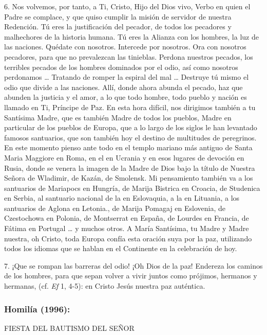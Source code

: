 \begin{body}
	6. Nos volvemos, por tanto, a Ti, Cristo, Hijo del Dios vivo, Verbo en quien el Padre se complace, y que quiso cumplir la misión de servidor de nuestra Redención. Tú eres la justificación del pecador, de todos los pecadores y malhechores de la historia humana. Tú eres la Alianza con los hombres, la luz de las naciones. Quédate con nosotros. Intercede por nosotros. Ora con nosotros pecadores, para que no prevalezcan las tinieblas. Perdona nuestros pecados, los terribles pecados de los hombres dominados por el odio, así como nosotros perdonamos \ldots{} Tratando de romper la espiral del mal \ldots{} Destruye tú mismo el odio que divide a las naciones. Allí, donde ahora abunda el pecado, haz que abunden la justicia y el amor, a lo que todo hombre, todo pueblo y nación es llamado en Ti, Príncipe de Paz. En esta hora difícil, nos dirigimos también a tu Santísima Madre, que es también Madre de todos los pueblos, Madre en particular de los pueblos de Europa, que a lo largo de los siglos le han levantado famosos santuarios, que son también hoy el destino de multitudes de peregrinos. En este momento pienso ante todo en el templo mariano más antiguo de Santa Maria Maggiore en Roma, en el  en Ucrania y en esos lugares de devoción en Rusia, donde se venera la imagen de la Madre de Dios bajo la título de Nuestra Señora de Wladimir, de Kazán, de Smolensk. Mi pensamiento también va a los santuarios de Mariapocs en Hungría, de Marija Bistrica en Croacia, de Studenica en Serbia, al santuario nacional de la  en Eslovaquia, a la  en Lituania, a los santuarios de Aglona en Letonia., de Marija Pomagaj en Eslovenia, de Czestochowa en Polonia, de Montserrat en España, de Lourdes en Francia, de Fátima en Portugal \ldots{} y muchos otros. A María Santísima, tu Madre y Madre nuestra, oh Cristo, toda Europa confía esta oración suya por la paz, utilizando todos los idiomas que se hablan en el Continente en la celebración de hoy.

	7. ¡Que se rompan las barreras del odio! ¡Oh Dios de la paz! Endereza los caminos de los hombres, para que sepan volver a vivir juntos como prójimos, hermanos y hermanas,  (cf. \emph{Ef} 1, 4-5): en Cristo Jesús nuestra paz auténtica.

	\subsubsection{Homilía (1996):} FIESTA DEL BAUTISMO DEL SEÑOR


\end{body}
